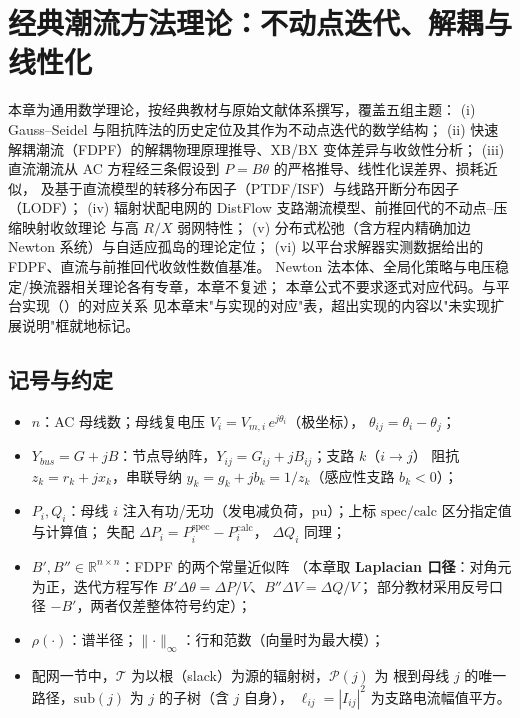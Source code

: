 
\section{经典潮流方法理论：不动点迭代、解耦与线性化}\label{sec:pf-th-cls}

\begin{theorynote}
本章为通用数学理论，按经典教材与原始文献体系撰写，覆盖五组主题：
(i) Gauss--Seidel 与阻抗阵法的历史定位及其作为不动点迭代的数学结构；
(ii) 快速解耦潮流（FDPF）的解耦物理原理推导、XB/BX 变体差异与收敛性分析；
(iii) 直流潮流从 AC 方程经三条假设到 $P=B\theta$ 的严格推导、线性化误差界、损耗近似，
及基于直流模型的转移分布因子（PTDF/ISF）与线路开断分布因子（LODF）；
(iv) 辐射状配电网的 DistFlow 支路潮流模型、前推回代的不动点--压缩映射收敛理论
与高 $R/X$ 弱网特性；
(v) 分布式松弛（含方程内精确加边 Newton 系统）与自适应孤岛的理论定位；
(vi) 以平台求解器实测数据给出的 FDPF、直流与前推回代收敛性数值基准。
Newton 法本体、全局化策略与电压稳定/换流器相关理论各有专章，本章不复述；
本章公式不要求逐式对应代码。与平台实现（）的对应关系
见本章末"与实现的对应"表，超出实现的内容以"未实现扩展说明"框就地标记。
\end{theorynote}

\subsection{记号与约定}\label{sec:pf-th-cls-notation}
\begin{itemize}
  \item $n$：AC 母线数；母线复电压 $V_i=V_{m,i}\,e^{j\theta_i}$（极坐标），
        $\theta_{ij}=\theta_i-\theta_j$；
  \item $Y_{bus}=G+jB$：节点导纳阵，$Y_{ij}=G_{ij}+jB_{ij}$；支路 $k$（$i\!\to\!j$）
        阻抗 $z_k=r_k+jx_k$，串联导纳 $y_k=g_k+jb_k=1/z_k$（感应性支路 $b_k<0$）；
  \item $P_i,Q_i$：母线 $i$ 注入有功/无功（发电减负荷，pu）；上标
        $\mathrm{spec}/\mathrm{calc}$ 区分指定值与计算值；
        失配 $\Delta P_i=P_i^{\mathrm{spec}}-P_i^{\mathrm{calc}}$，
        $\Delta Q_i$ 同理；
  \item $B',B''\in\mathbb R^{n\times n}$：FDPF 的两个常量近似阵
        （本章取\textbf{ Laplacian 口径}：对角元为正，迭代方程写作
        $B'\Delta\theta=\Delta P/V$、$B''\Delta V=\Delta Q/V$；
        部分教材采用反号口径 $-B'$，两者仅差整体符号约定）；
  \item $\rho(\cdot)$：谱半径；$\lVert\cdot\rVert_\infty$：行和范数（向量时为最大模）；
  \item 配网一节中，$\mathcal T$ 为以根（slack）为源的辐射树，$\mathcal P(j)$ 为
        根到母线 $j$ 的唯一路径，$\mathrm{sub}(j)$ 为 $j$ 的子树（含 $j$ 自身），
        $\ell_{ij}=|I_{ij}|^2$ 为支路电流幅值平方。
\end{itemize}

